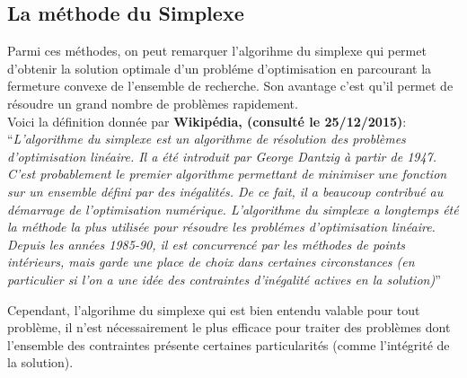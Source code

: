 \documentclass[a4paper,11pt,oneside]{report}
\theoremstyle{plain}
\newcommand{\0}{/ \! \! \! 0}
\theoremstyle{plain}
\begin{document}
\subsection{La m\'ethode du Simplexe}
 Parmi ces m\'ethodes, on peut remarquer l'algorihme du simplexe qui permet d'obtenir la solution optimale d'un probl\'eme d'optimisation en parcourant la 
 fermeture convexe de l'ensemble de recherche. Son avantage c'est qu'il permet de r\'esoudre un grand nombre de probl\`emes rapidement.\\\vspace{0.4cm}
 Voici la d\'efinition donn\'ee par {\bf Wikip\'edia, (consult\'e le 25/12/2015)}:\\
 ``{\it L'algorithme du simplexe est un algorithme de r\'esolution des probl\`emes d'optimisation lin\'eaire. Il a \'et\'e introduit par George Dantzig
 \`a partir de 1947. C'est probablement le premier algorithme permettant de minimiser une fonction sur un ensemble d\'efini par des in\'egalit\'es. 
De ce fait, il a beaucoup contribu\'e au d\'emarrage de l'optimisation num\'erique. L'algorithme du simplexe a longtemps \'et\'e la m\'ethode la plus utilis\'ee
 pour r\'esoudre les probl\'emes d'optimisation lin\'eaire. Depuis les ann\'ees 1985-90, il est concurrenc\'e par les m\'ethodes de points int\'erieurs, mais garde 
 une place de choix dans certaines circonstances (en particulier si l'on a une id\'ee des contraintes d'in\'egalit\'e actives en la solution)}''
 \vspace{0.4cm}
 
                                                                                  
 Cependant, l'algorihme du simplexe qui est bien entendu valable pour tout probl\`eme, il n'est n\'ecessairement le plus efficace pour traiter des
 probl\`emes dont l'ensemble des contraintes pr\'esente certaines particularit\'es (comme l'int\'egrit\'e de la solution).
\end{document}

